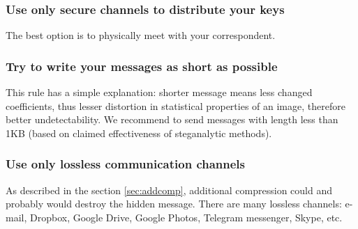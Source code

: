 \subsubsection{Use only secure channels to distribute your keys}
The best option is to physically meet with your correspondent.


\subsubsection{Try to write your messages as short as possible}
This rule has a simple explanation: shorter message means less changed coefficients, thus
lesser distortion in statistical properties of an image, therefore better undetectability.
We recommend to send messages with length less than 1KB (based on claimed effectiveness
of steganalytic methods).

\subsubsection{Use only lossless communication channels}
As described in the section \ref{sec:addcomp}, additional compression could and probably
would destroy the hidden message. There are many lossless channels: e-mail, Dropbox, Google Drive,
Google Photos, Telegram messenger, Skype, etc.
